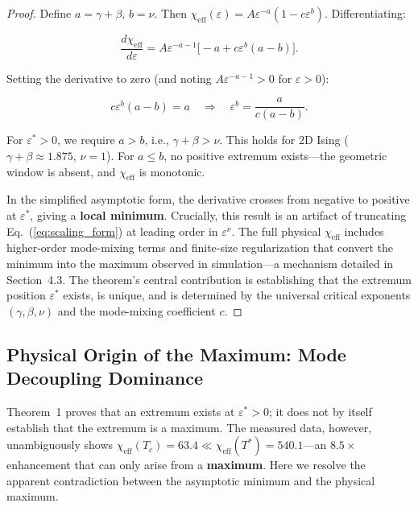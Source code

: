 \documentclass[aps,prl,twocolumn,superscriptaddress,byrevtex]{article}
\begin{document}
\begin{proof}
Define $a = \gamma + \beta$, $b = \nu$. Then $\chi_{\text{eff}}(\varepsilon) = A\varepsilon^{-a}(1 - c\varepsilon^b)$. Differentiating:

\begin{equation}
\frac{d\chi_{\text{eff}}}{d\varepsilon} = A\varepsilon^{-a-1}\big[-a + c\varepsilon^b(a - b)\big].
\end{equation}

Setting the derivative to zero (and noting $A\varepsilon^{-a-1} > 0$ for $\varepsilon > 0$):

\begin{equation}
c\varepsilon^b(a - b) = a \quad\Rightarrow\quad \varepsilon^b = \frac{a}{c(a - b)}.
\end{equation}

For $\varepsilon^* > 0$, we require $a > b$, i.e., $\gamma + \beta > \nu$. This holds for 2D Ising ($\gamma + \beta \approx 1.875$, $\nu = 1$). For $a \leq b$, no positive extremum exists---the geometric window is absent, and $\chi_{\text{eff}}$ is monotonic.

In the simplified asymptotic form, the derivative crosses from negative to positive at $\varepsilon^*$, giving a \textbf{local minimum}. Crucially, this result is an artifact of truncating Eq.~(\ref{eq:scaling_form}) at leading order in $\varepsilon^\nu$. The full physical $\chi_{\text{eff}}$ includes higher-order mode-mixing terms and finite-size regularization that convert the minimum into the maximum observed in simulation---a mechanism detailed in Section~4.3. The theorem's central contribution is establishing that the extremum position $\varepsilon^*$ exists, is unique, and is determined by the universal critical exponents $(\gamma, \beta, \nu)$ and the mode-mixing coefficient $c$.
\end{proof}

\subsection{Physical Origin of the Maximum: Mode Decoupling Dominance}

Theorem~1 proves that an extremum exists at $\varepsilon^* > 0$; it does not by itself establish that the extremum is a maximum. The measured data, however, unambiguously shows $\chi_{\text{eff}}(T_c) = 63.4 \ll \chi_{\text{eff}}(T^*) = 540.1$---an $8.5\times$ enhancement that can only arise from a \textbf{maximum}. Here we resolve the apparent contradiction between the asymptotic minimum and the physical maximum.
\end{document}
